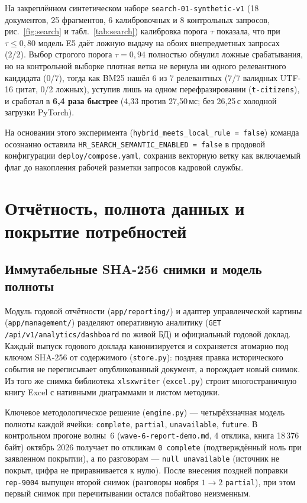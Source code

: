 \documentclass[10pt,a4paper,twocolumn]{article}
\newcommand{\code}[1]{\texttt{#1}}
\begin{document}
На закреплённом синтетическом наборе \code{search-01-synthetic-v1} (18 документов, 25 фрагментов,
6 калибровочных и 8 контрольных запросов, рис.~\ref{fig:search} и табл.~\ref{tab:search})
калибровка порога $\tau$ показала, что при $\tau \le 0{,}80$ модель E5 даёт ложную выдачу на
обоих внепредметных запросах (2/2). Выбор строгого порога $\tau = 0{,}94$ полностью обнулил
ложные срабатывания, но на контрольной выборке плотная ветка не вернула ни одного релевантного
кандидата (0/7), тогда как BM25 нашёл 6 из 7 релевантных (7/7 валидных UTF-16 цитат, 0/2
ложных), уступив лишь на одном перефразировании (\code{t-citizens}), и сработал в \textbf{6,4
раза быстрее} (4,33 против 27,50\,мс; без 26,25\,с холодной загрузки PyTorch).

На основании этого эксперимента (\code{hybrid\_meets\_local\_rule = false}) команда осознанно
оставила \code{HR\_SEARCH\_SEMANTIC\_ENABLED = false} в продовой конфигурации
\code{deploy/compose.yaml}, сохранив векторную ветку как включаемый флаг до накопления
рабочей разметки запросов кадровой службы.

\section{Отчётность, полнота данных и покрытие потребностей}

\subsection{Иммутабельные SHA-256 снимки и модель полноты}

Модуль годовой отчётности (\code{app/reporting/}) и адаптер управленческой картины
(\code{app/management/}) разделяют оперативную аналитику (\code{GET /api/v1/analytics/dashboard}
по живой БД) и официальный годовой доклад. Каждый выпуск годового доклада канонизируется и
сохраняется атомарно под ключом SHA-256 от содержимого (\code{store.py}): поздняя правка
исторического события не переписывает опубликованный документ, а порождает новый снимок.
Из того же снимка библиотека \code{xlsxwriter} (\code{excel.py}) строит многостраничную книгу
Excel с нативными диаграммами и листом методики.

Ключевое методологическое решение (\code{engine.py}) — четырёхзначная модель полноты каждой
ячейки: \code{complete}, \code{partial}, \code{unavailable}, \code{future}. В контрольном
прогоне волны~6 (\code{wave-6-report-demo.md}, 4 отклика, книга 18\,376 байт) октябрь 2026
получает по откликам \code{0 complete} (подтверждённый ноль при заявленном покрытии), а по
разговорам — \code{null unavailable} (источник не покрыт, цифра не приравнивается к нулю).
После внесения поздней поправки \code{rep-9004} выпущен второй снимок (разговоры ноября
$1 \to 2$ \code{partial}), при этом первый снимок при перечитывании остался побайтово неизменным.
\end{document}
